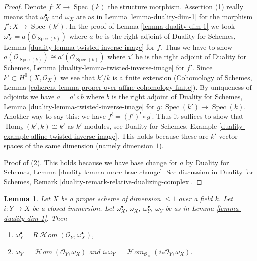 \documentclass{stacks-project}
\theoremstyle{plain}
\newtheorem{lemma}[subsection]{Lemma}
\theoremstyle{definition}
\theoremstyle{remark}
\numberwithin{equation}{subsection}
\def\Spec{\mathop{\mathrm{Spec}}}
\def\Hom{\mathop{\mathrm{Hom}}\nolimits}
\def\SheafHom{\mathop{\mathcal{H}\!\mathit{om}}\nolimits}
\begin{document}
\begin{proof}
Denote $f : X \to \Spec(k)$ the structure morphism.
Assertion (1) really means that $\omega_X^\bullet$ and $\omega_X$
are as in Lemma \ref{lemma-duality-dim-1} for the morphism
$f' : X \to \Spec(k')$. In the proof of Lemma \ref{lemma-duality-dim-1}
we took $\omega_X^\bullet = a(\mathcal{O}_{\Spec(k)})$
where $a$ be is the right adjoint of
Duality for Schemes, Lemma
\ref{duality-lemma-twisted-inverse-image} for $f$.
Thus we have to show
$a(\mathcal{O}_{\Spec(k)}) \cong a'(\mathcal{O}_{\Spec(k)})$
where $a'$ be is the right adjoint of
Duality for Schemes, Lemma
\ref{duality-lemma-twisted-inverse-image} for $f'$.
Since $k' \subset H^0(X, \mathcal{O}_X)$ we see that $k'/k$ is a finite
extension (Cohomology of Schemes, Lemma
\ref{coherent-lemma-proper-over-affine-cohomology-finite}).
By uniqueness of adjoints we have $a = a' \circ b$ where
$b$ is the right adjoint of Duality for Schemes, Lemma
\ref{duality-lemma-twisted-inverse-image} for $g : \Spec(k') \to \Spec(k)$.
Another way to say this: we have $f^! = (f')^! \circ g^!$.
Thus it suffices to show that $\Hom_k(k', k) \cong k'$ as
$k'$-modules, see Duality for Schemes, Example
\ref{duality-example-affine-twisted-inverse-image}.
This holds because these are $k'$-vector spaces of
the same dimension (namely dimension $1$).

\medskip\noindent
Proof of (2). This holds because we have base change for $a$ by
Duality for Schemes, Lemma \ref{duality-lemma-more-base-change}.
See discussion in Duality for Schemes, Remark
\ref{duality-remark-relative-dualizing-complex}.
\end{proof}

\begin{lemma}
\label{lemma-closed-immersion-dim-1-CM}
Let $X$ be a proper scheme of dimension $\leq 1$ over a field $k$.
Let $i : Y \to X$ be a closed immersion.
Let $\omega_X^\bullet$, $\omega_X$, $\omega_Y^\bullet$, $\omega_Y$
be as in Lemma \ref{lemma-duality-dim-1}. Then
\begin{enumerate}
\item $\omega_Y^\bullet = R\SheafHom(\mathcal{O}_Y, \omega_X^\bullet)$,
\item $\omega_Y = \SheafHom(\mathcal{O}_Y, \omega_X)$ and
$i_*\omega_Y = \SheafHom_{\mathcal{O}_X}(i_*\mathcal{O}_Y, \omega_X)$.
\end{enumerate}
\end{lemma}
\end{document}
